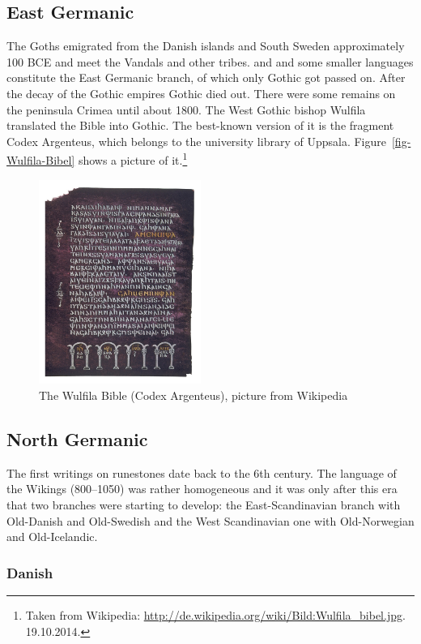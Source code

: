 \subsection{East Germanic}

The Goths emigrated from the Danish islands and South Sweden approximately 100 BCE and meet the
Vandals and other tribes.   and  and some smaller languages constitute the East Germanic branch, of which only Gothic got passed on.
After the decay of the Gothic empires Gothic died out. There were some remains on the peninsula
Crimea until about 1800. The West Gothic bishop Wulfila translated the Bible into Gothic. The
best-known version of it is the fragment Codex Argenteus, which belongs to the university library of
Uppsala. Figure~\vref{fig-Wulfila-Bibel} shows a picture of it.\footnote{
Taken from Wikipedia: \url{http://de.wikipedia.org/wiki/Bild:Wulfila_bibel.jpg}. 19.10.2014.
}
\begin{figure}
\includegraphics[width=53mm]{Pictures/Wulfila_bibel}
\caption{\label{fig-Wulfila-Bibel}The Wulfila Bible (Codex Argenteus), picture from Wikipedia}
\end{figure}



\subsection{North Germanic}

The first writings on runestones date back to the 6th century. The language of the Wikings
(800--1050) was rather homogeneous and it was only after this era that two branches were starting to
develop: the East-Scandinavian branch with Old-Danish and Old-Swedish and the West Scandinavian one
with Old-Norwegian and Old-Icelandic.


\subsubsection{Danish}

